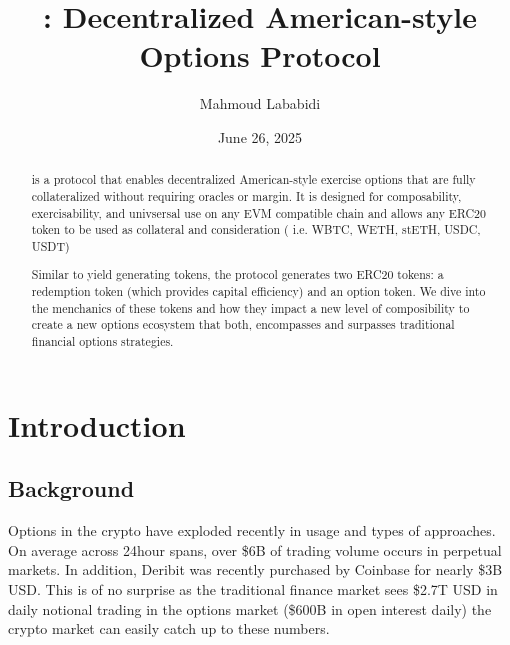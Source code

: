 \title{\greekfi: Decentralized American-style Options Protocol}

\author{Mahmoud Lababidi}

\date{June 26, 2025}

\begin{abstract}
\greekfi is a protocol that enables decentralized American-style exercise options that are fully collateralized without requiring oracles or margin. 
It is designed for composability, exercisability, and univsersal use on any EVM compatible chain and allows any ERC20 token to be used as collateral and consideration ( i.e. WBTC, WETH, stETH, USDC, USDT) 

Similar to yield generating tokens, the protocol generates two ERC20 tokens: a redemption token (which provides capital efficiency) and an option token.
We dive into the menchanics of these tokens and how they impact a new level of composibility to create a new options ecosystem that both, encompasses and surpasses traditional financial options strategies.


\end{abstract}

\maketitle

\section{\label{sec:introduction}Introduction}

\subsection{Background}
Options in the crypto have exploded recently in usage and types of approaches. 
On average across 24hour spans, over \$6B of trading volume occurs in perpetual markets. 
In addition, Deribit was recently purchased by Coinbase for nearly \$3B USD. 
This is of no surprise as the traditional finance market sees \$2.7T USD in daily notional trading in the options market (\$600B in open interest daily) the crypto market can easily catch up to these numbers.

